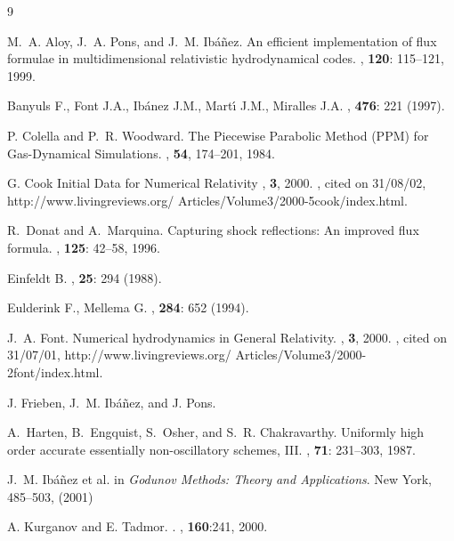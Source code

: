 \documentclass{article}
\begin{document}
\begin{thebibliography}{9}

M.~A. Aloy, J.~A. Pons, and J.~M. Ib{\'a}{\~n}ez.
\newblock An efficient implementation of flux formulae in multidimensional
  relativistic hydrodynamical codes.
, {\bf 120}: 115--121, 1999.

Banyuls F., Font J.A., Ib{\'a}nez J.M., Mart\'{\i} J.M., Miralles J.A.
, {\bf 476}: 221 (1997).

P. Colella and P.~R. Woodward.
\newblock The {P}iecewise {P}arabolic {M}ethod ({PPM}) for
{G}as-{D}ynamical {S}imulations.
, {\bf 54}, 174--201, 1984.

G. Cook
\newblock Initial Data for Numerical Relativity
, {\bf 3}, 2000.
, cited on 31/08/02,
  http://www.livingreviews.org/ Articles/Volume3/2000-5cook/index.html.

R.~Donat and A.~Marquina.
\newblock Capturing shock reflections: An improved flux formula.
, {\bf 125}: 42--58, 1996.

Einfeldt B.
, {\bf 25}: 294 (1988).

Eulderink F., Mellema G.
, {\bf 284}: 652 (1994).

J.~A. Font.
\newblock Numerical hydrodynamics in {G}eneral {R}elativity.
, {\bf 3}, 2000.
, cited on 31/07/01,
  http://www.livingreviews.org/ Articles/Volume3/2000-2font/index.html.

J. Frieben, J.~M. Ib{\'a}{\~n}ez, and J. Pons.

A.~Harten, B.~Engquist, S.~Osher, and S.~R. Chakravarthy.
\newblock Uniformly high order accurate essentially non-oscillatory schemes,
  {III}.
, {\bf 71}: 231--303, 1987.

J.~M. Ib{\'a}{\~n}ez et al.
\newblock in {\em Godunov Methods: Theory and Applications}.
\newblock New York, 485--503, (2001)

A. Kurganov and E. Tadmor.
.
, {\bf 160}:241, 2000.


\end{thebibliography}
\end{document}
